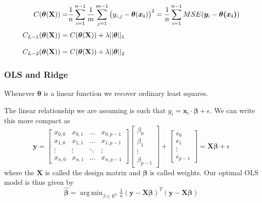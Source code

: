 \documentclass{article}
\theoremstyle{definition}
\DeclareMathOperator*{\argmin}{arg\,min}
\begin{document}
\begin{align*}
C (\boldsymbol{\theta}(\mathbf{X})) =& \frac{1}{n} \sum_{i=1}^{n-1} \frac{1}{m}\sum_{j=1}^{m-1} \left(y_{i,j} - \boldsymbol{\theta}(\boldsymbol{x_i})\right)^2 =  \frac{1}{n} \sum_{i=1}^{n-1} MSE(\boldsymbol{y}_i - \boldsymbol{\theta(x_i)}) \\[1mm]
C_{L-1} (\boldsymbol{\theta}(\mathbf{X}))= & \hspace{1mm} C(\boldsymbol{\theta}(\mathbf{X})) + \lambda ||\boldsymbol{\theta}||_1\\[3mm]
C_{L-2} (\boldsymbol{\theta}(\mathbf{X}))= & \hspace{1mm} C(\boldsymbol{\theta}(\mathbf{X})) + \lambda  ||\boldsymbol{\theta}||_2
\end{align*}



\subsubsection{OLS and Ridge}
Whenever $\boldsymbol{\theta}$ is a linear function we recover ordinary least squares.

The linear relationship we are assuming is such that $y_i = \mathbf{x}_i \cdot \bm{\beta} + \epsilon$. We can write this more compact as
\begin{equation*}
    \mathbf{y} =
    \begin{bmatrix}
        x_{0,0} & x_{0,1} & \ldots & x_{0, p-1} \\
        x_{1,0} & x_{1,1} & \ldots & x_{1, p-1} \\
        \vdots & \vdots & \ddots & \vdots \\
        x_{n,0} & x_{n,1} & \ldots & x_{n, p-1}
    \end{bmatrix}
    \begin{bmatrix}
        \beta_0 \\
        \beta_1 \\
        \vdots \\
        \beta_{p-1}
    \end{bmatrix}
    +
    \begin{bmatrix}
        \epsilon_0 \\
        \epsilon_1 \\
        \vdots \\
        \epsilon_{p-1}
    \end{bmatrix}
    = \mathbf{X}\bm{\beta} + \epsilon
\end{equation*}
where the $\mathbf{X}$ is called the design matrix and $\bm{\beta}$ is called weights. Our optimal OLS model is thus given by
\begin{equation*}
    \bm{\hat{\beta}} = \argmin_{\beta \in \mathbb{R}^p}\tfrac{1}{n}(\mathbf{y} - \mathbf{X}\bm{\beta})^T(\mathbf{y} - \mathbf{X}\bm{\beta})
\end{equation*}
\end{document}
